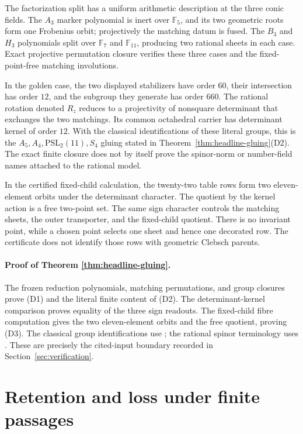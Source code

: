 \documentclass[11pt]{article}
\theoremstyle{definition}
\theoremstyle{remark}
\newcommand{\F}{\mathbb{F}}
\begin{document}
The factorization split has a uniform arithmetic description at the three
conic fields.  The $A_3$ marker polynomial is inert over $\F_5$, and its two
geometric roots form one Frobenius orbit; projectively the matching datum
is fused.  The $B_3$ and $H_3$ polynomials split over $\F_7$ and $\F_{11}$,
producing two rational sheets in each case.  Exact projective
permutation closure verifies these three cases and the fixed-point-free
matching involutions.

In the golden case, the two displayed stabilizers have order $60$, their
intersection has order $12$, and the subgroup they generate has order
$660$.  The rational rotation denoted $R_z$ reduces to a projectivity of
nonsquare determinant that exchanges the two matchings.  Its common
octahedral carrier has determinant kernel of order $12$.  With the
classical identifications of these literal groups, this is the
$A_5,A_4,\mathrm{PSL}_2(11),S_4$ gluing stated in
Theorem~\ref{thm:headline-gluing}(D2).  The exact finite closure does not by
itself prove the spinor-norm or number-field names attached to the rational
model.

In the certified fixed-child calculation, the twenty-two table rows form two
eleven-element orbits under the determinant character.
The quotient by the kernel action is a free two-point set.  The same sign
character controls the matching sheets, the outer transporter, and the
fixed-child quotient.  There is no invariant point, while a chosen point
selects one sheet and hence one decorated row.  The certificate does not
identify those rows with geometric Clebsch parents.

\paragraph{Proof of Theorem \ref{thm:headline-gluing}.}
The frozen reduction polynomials, matching permutations, and group
closures prove (D1) and the literal finite content of (D2).  The
determinant-kernel comparison proves equality of the three sign readouts.
The fixed-child fibre computation gives the two eleven-element orbits and
the free quotient, proving (D3).  The classical group identifications use
\cite{Giudici2007,Atlas1985}; the rational spinor terminology uses
\cite[Ch.~11]{Taylor1992}.  These are precisely the cited-input boundary
recorded in Section~\ref{sec:verification}.

\section{Retention and loss under finite passages}
\label{sec:survival}
\end{document}
